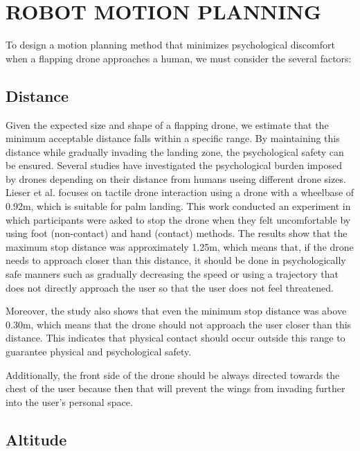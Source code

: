 \section{ROBOT MOTION PLANNING}

\label{sec:motion-planning}

To design a motion planning method that minimizes psychological discomfort when a flapping drone approaches a human, we must consider the several factors:

\subsection{Distance}
\label{sec:distance}
Given the expected size and shape of a flapping drone, we estimate that the minimum acceptable distance falls within a specific range. By maintaining this distance while gradually invading the landing zone, the psychological safety can be ensured.
Several studies have investigated the psychological burden imposed by drones depending on their distance from humans useing different drone sizes\cite{Yeh2017Proxemics, lieser2021evaluating-distances,Duncan2013comfortable-approach, Acharya2017robot-vs-drone-comfort}.
Lieser et al. \cite{lieser2021evaluating-distances} focuses on tactile drone interaction using a drone with a wheelbase of 0.92m, which is suitable for palm landing.
This work conducted an experiment in which participants were asked to stop the drone when they felt uncomfortable by using foot (non-contact) and hand (contact) methods.
The results show that the maximum stop distance was approximately 1.25m,
which means that, if the drone needs to approach closer than this distance, it should be done in psychologically safe manners such as gradually decreasing the speed or using a trajectory that does not directly approach the user so that the user does not feel threatened.

Moreover, the study \cite{lieser2021evaluating-distances} also shows that even the minimum stop distance was above 0.30m, 
which means that the drone should not approach the user closer than this distance.
This indicates that physical contact should occur outside this range to guarantee physical and psychological safety.

Additionally, the front side of the drone should be always directed towards the chest of the user
because then that will prevent the wings from invading further into the user's personal space.

\subsection{Altitude}

